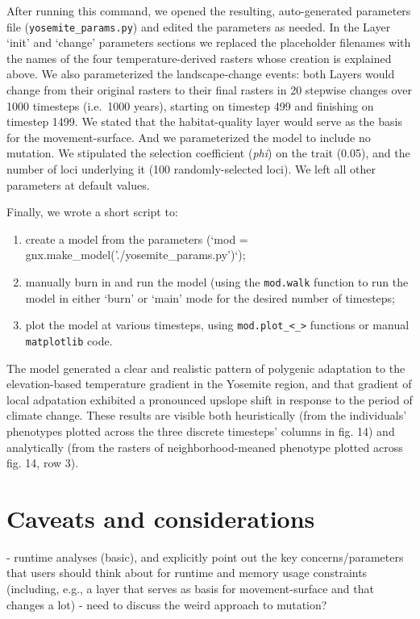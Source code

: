 ﻿\documentclass{article}
\begin{document}
After running this command, we opened the resulting, auto-generated parameters
file (\texttt{yosemite\_params.py}) and edited the parameters as needed.
In the Layer `init' and `change' parameters sections we replaced
the placeholder filenames with the names of the four temperature-derived
rasters whose creation is explained above.
We also parameterized the landscape-change events:
both Layers would change from their original rasters to their final
rasters in 20 stepwise changes over 1000 timesteps (i.e.\ 1000 years),
starting on timestep 499 and finishing on timestep 1499.
We stated that the habitat-quality layer would serve as the basis for the movement-surface.
And we parameterized the model to include no mutation.
We stipulated the selection coefficient (\emph{phi}) on the trait (0.05),
and the number of loci underlying it (100 randomly-selected loci).
We left all other parameters at default values.

Finally, we wrote a short script to:
\begin{enumerate}
  \item create a model from the parameters (`mod = gnx.make\_model('./yosemite\_params.py')`);
  \item manually burn in and run the model (using the \texttt{mod.walk} function to run the model
in either `burn' or `main' mode for the desired number of timesteps;
  \item plot the model at various timesteps, using \texttt{mod.plot\_<\_>} functions or manual \texttt{matplotlib} code.
\end{enumerate}

The model generated a clear and realistic pattern of polygenic adaptation to
the elevation-based temperature gradient in the Yosemite region, and that
gradient of local adpatation exhibited a pronounced upslope shift in response to
the period of climate change. These results are visible both heuristically
(from the individuals' phenotypes plotted across the three discrete timesteps' columns in fig. 14)
and analytically (from the rasters of neighborhood-meaned phenotype plotted across fig. 14, row 3).


\section{Caveats and considerations}
- runtime analyses (basic), and explicitly point out the key concerns/parameters
that users should think about for runtime and memory usage constraints (including, e.g.,
a layer that serves as basis for movement-surface and that changes a lot)
- need to discuss the weird approach to mutation?
\end{document}

